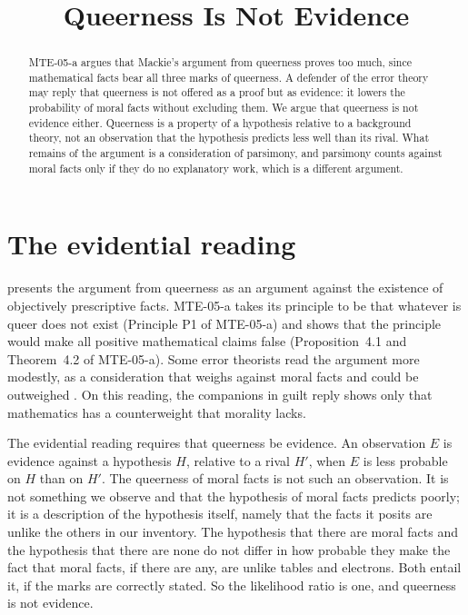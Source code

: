 \documentclass{situationist-preprint}
\title{Queerness Is Not Evidence}
\begin{document}
\maketitle

\begin{abstract}
MTE-05-a argues that Mackie's argument from queerness proves too much, since mathematical facts bear all three marks of queerness. A defender of the error theory may reply that queerness is not offered as a proof but as evidence: it lowers the probability of moral facts without excluding them. We argue that queerness is not evidence either. Queerness is a property of a hypothesis relative to a background theory, not an observation that the hypothesis predicts less well than its rival. What remains of the argument is a consideration of parsimony, and parsimony counts against moral facts only if they do no explanatory work, which is a different argument.
\end{abstract}

\section{The evidential reading}\label{s:ev}

\citet[ch.~1.9]{Mackie1977} presents the argument from queerness as an argument against the existence of objectively prescriptive facts. MTE-05-a takes its principle to be that whatever is queer does not exist (Principle P1 of MTE-05-a) and shows that the principle would make all positive mathematical claims false (Proposition~4.1 and Theorem~4.2 of MTE-05-a). Some error theorists read the argument more modestly, as a consideration that weighs against moral facts and could be outweighed \citep{Olson2014}. On this reading, the companions in guilt reply shows only that mathematics has a counterweight that morality lacks.

The evidential reading requires that queerness be evidence. An observation $E$ is evidence against a hypothesis $H$, relative to a rival $H'$, when $E$ is less probable on $H$ than on $H'$. The queerness of moral facts is not such an observation. It is not something we observe and that the hypothesis of moral facts predicts poorly; it is a description of the hypothesis itself, namely that the facts it posits are unlike the others in our inventory. The hypothesis that there are moral facts and the hypothesis that there are none do not differ in how probable they make the fact that moral facts, if there are any, are unlike tables and electrons. Both entail it, if the marks are correctly stated. So the likelihood ratio is one, and queerness is not evidence.
\end{document}
